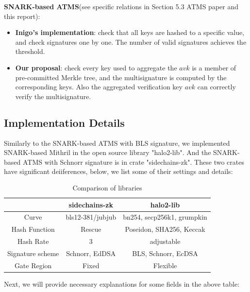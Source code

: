 \documentclass{article}
\begin{document}
\vspace{0.3cm}


\textbf{SNARK-based ATMS}(see specific relations in Section 5.3 ATMS paper and this report):

\begin{itemize}
    \item \textbf{Inigo's implementation}: check that all keys are hashed to a specific value, and check signatures one by one. The number of valid signatures achieves the threshold.
    \item \textbf{Our proposal}: check every key used to aggregate the $avk$ is a member of pre-committed Merkle tree, and the multisignature is computed by the corresponding keys. Also the aggregated verification key $avk$ can correctly verify the multisignature.
\end{itemize}

\subsection{Implementation Details}


Similarly to the SNARK-based ATMS with BLS signature, we implemented SNARK-based Mithril in the open source library "halo2-lib". And the SNARK-based ATMS with Schnorr signature is in crate "sidechains-zk". These two crates have significant deiiferences, below, we list some of their settings and details:

\begin{table}[H]
    \centering
    \begin{tabular}{c|c|c} \hline
        & sidechains-zk & halo2-lib \\ \hline
       Curve&  bls12-381/jubjub& bn254, secp256k1, grumpkin  \\ 
       Hash Function& Rescue &Poseidon, SHA256, Keccak \\ 
       Hash Rate & 3 & adjustable \\ 
       Signature scheme& Schnorr, EdDSA& BLS, Schnorr, EcDSA \\ 
        Gate Region& Fixed & Flexible \\ \hline
    \end{tabular}
    \caption{Comparison of libraries}
    \label{tab:my_label}
\end{table}


Next, we will provide necessary explanations for some fields in the above table:
\end{document}
